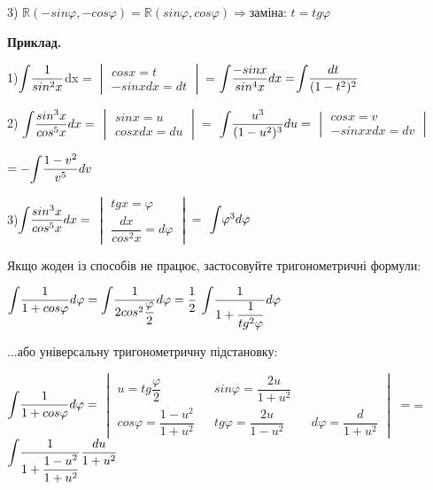 \documentclass[12pt]{report}
\begin{document}
 3) $ \mathbb{R}(-sin\varphi, -cos\varphi)=  \mathbb{R}(sin\varphi ,cos\varphi)\Rightarrow
 $заміна: $t = tg\varphi$
 
  \vspace{5mm} 
  
  \textbf{Приклад.}
  
    \vspace{3 mm} 
  1)$\mathlarger \int \dfrac{1}{sin^2x}$dx = 
  $ \begin{vmatrix}
cos  x = t \\
-sinxdx = dt
  \end{vmatrix} = $$\mathlarger \int \dfrac{-sinx}{sin^4x} dx= $$\mathlarger \int \dfrac{dt}{(1-t^2)^2}$
 
 \vspace{2 mm} 
  2) $\mathlarger \int \dfrac{sin^3x}{cos^5x}dx= $ 
    $ \begin{vmatrix}
  sinx = u \\
  cosxdx = du
  \end{vmatrix} = $
  $\mathlarger \int \dfrac{u^3 }{(1 - u^2)^3}du= $
   $ \begin{vmatrix}
  cosx = v \\
  -sinxxdx = dv
  \end{vmatrix}$
  
   \vspace{1 mm} 
$ =  -\mathlarger \int \dfrac{1-v^2}{v^5}dv $

 \vspace{2 mm} 
 3)$\mathlarger \int \dfrac{sin^3x}{cos^5x}dx= $ 
 $ \begin{vmatrix}
 tgx = \varphi \\
 \dfrac{dx} {cos^2x}= d\varphi
 \end{vmatrix} = $
 $\mathlarger \int \varphi^3 d\varphi$
 
  \vspace{3 mm} 
 Якщо жоден із способів не працює, застосовуйте тригонометричні формули:
 
  \vspace{3 mm} 
  $\mathlarger \int \dfrac{1}{1+cos\varphi} d\varphi=  \mathlarger \int\dfrac{1}{2cos^2\dfrac{\varphi}{2}} d\varphi = \dfrac{1}{2}$
  $ \mathlarger \int\dfrac{1}{1+\dfrac {1}{tg^2\varphi}}d\varphi $ 
  
  \vspace{3 mm} 
...або універсальну тригонометричну підстановку:

  $\mathlarger \int \dfrac{1}{1+cos\varphi} d\varphi=$
  $ \begin{vmatrix}
  u  = tg\dfrac{\varphi}{2}&&sin\varphi = \dfrac{2u}{1+u^2} \\
cos \varphi  = \dfrac{1-u^2}{1+u^2}&& tg \varphi = \dfrac {2u}{1-u^2}&&d\varphi = \dfrac{d}{1+u^2}
  \end{vmatrix} $
$=$= $\mathlarger \int \dfrac {1}{1+ \dfrac{1 - u^2}{1+u^2}}\dfrac {du}{1+u^2}$
\end{document}
